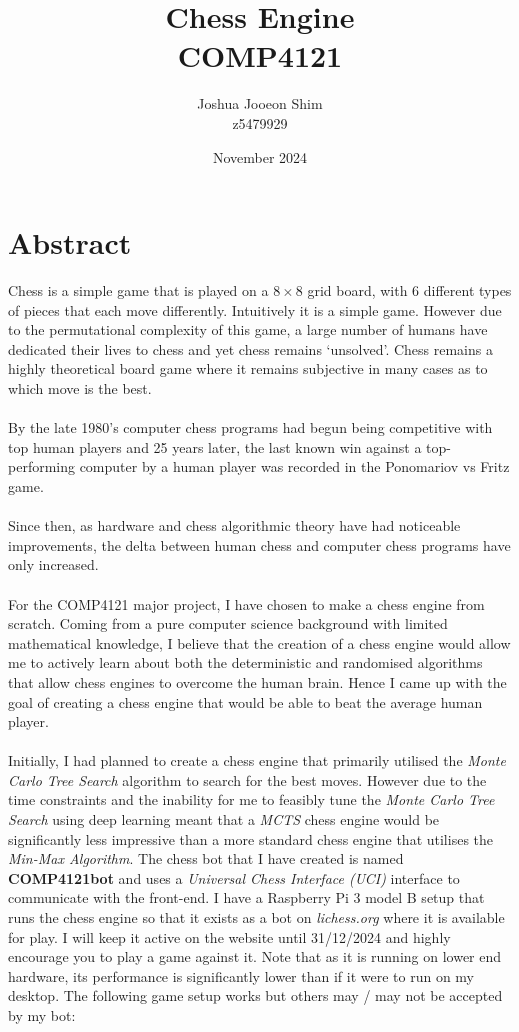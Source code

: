 \documentclass[a4paper,12pt]{report}
\title{Chess Engine\\
{\Large COMP4121}}
\author{Joshua Jooeon Shim \\ z5479929}
\date{November 2024}
\begin{document}
\maketitle
\chapter*{Abstract}

Chess is a simple game that is played on a $8 \times 8$ grid board, with 6 different types of pieces that each move differently. Intuitively it is a simple game. However due to the permutational complexity of this game, a large number of humans have dedicated their lives to chess and yet chess remains `unsolved'. Chess remains a highly theoretical board game where it remains subjective in many cases as to which move is the best.
\\\\
By the late 1980's computer chess programs had begun being competitive with top human players and 25 years later, the last known win against a top-performing computer by a human player was recorded in the Ponomariov vs Fritz game.
\\\\
Since then, as hardware and chess algorithmic theory have had noticeable improvements, the delta between human chess and computer chess programs have only increased.
\\\\
For the COMP4121 major project, I have chosen to make a chess engine from scratch. Coming from a pure computer science background with limited mathematical knowledge, I believe that the creation of a chess engine would allow me to actively learn about both the deterministic and randomised algorithms that allow chess engines to overcome the human brain. Hence I came up with the goal of creating a chess engine that would be able to beat the average human player.
\\\\
Initially, I had planned to create a chess engine that primarily utilised the \textit{Monte Carlo Tree Search} algorithm to search for the best moves. However due to the time constraints and the inability for me to feasibly tune the \textit{Monte Carlo Tree Search} using deep learning meant that a \textit{MCTS} chess engine would be significantly less impressive than a more standard chess engine that utilises the \textit{Min-Max Algorithm}.\newpage
The chess bot that I have created is named \textbf{COMP4121bot} and uses a \textit{Universal Chess Interface (UCI)} interface to communicate with the front-end. I have a Raspberry Pi 3 model B setup that runs the chess engine so that it exists as a bot on \textit{lichess.org} where it is available for play. I will keep it active on the website until 31/12/2024 and highly encourage you to play a game against it. Note that as it is running on lower end hardware, its performance is significantly lower than if it were to run on my desktop. The following game setup works but others may / may not be accepted by my bot:\\
\end{document}
